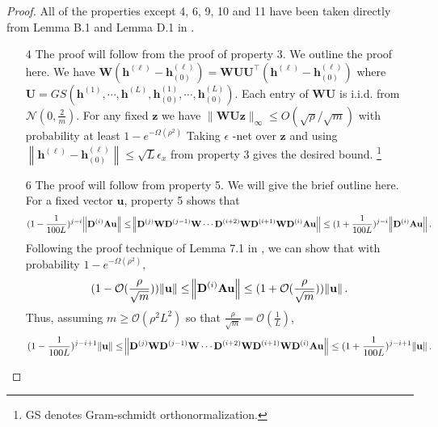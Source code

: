 \begin{proof}
	All of the properties except 4, 6, 9, 10 and 11 have been taken directly from Lemma B.1 and Lemma D.1 in \cite{allen2019can}. 
	\begin{enumerate}
		\item[4] The proof will follow from the proof of property 3. We outline the proof here. We have $\mathbf{W} (\mathbf{h}^{(\ell)} - \mathbf{h}^{(\ell)}_{(0)}) = \mathbf{W} \mathbf{U} \mathbf{U}^{\top} (\mathbf{h}^{(\ell)} - \mathbf{h}^{(\ell)}_{(0)})$ where $\mathbf{U}=G S\left(\mathbf{h}^{(1)}, \cdots, \mathbf{h}^{(L)}, \mathbf{h}^{(1)}_{(0)}, \cdots, \mathbf{h}^{(L)}_{(0)}\right) .$ Each entry of $\mathbf{W} \mathbf{U}$ is i.i.d. from $\mathcal{N}\left(0, \frac{2}{m}\right) .$ For any fixed $\mathbf{z}$ we have $\|\mathbf{W} \mathbf{U} \mathbf{z}\|_{\infty} \leq O(\sqrt{\rho} / \sqrt{m})$ with probability at least $1-e^{-\Omega\left(\rho^{2}\right)}$
		Taking $\epsilon$ -net over $\mathbf{z}$ and using $\left\|\mathbf{h}^{(\ell)} - \mathbf{h}^{(\ell)}_{(0)}\right\| \leq \sqrt{L}\epsilon_x$ from property 3 gives the desired bound. \footnote{GS denotes Gram-schmidt orthonormalization.}
		\item[6] The proof will follow from property 5. We will give the brief outline here. For a fixed vector $\mathbf{u}$, property 5 shows that
		\begin{equation*}
			(1 - \frac{1}{100L})^{j-i} \norm{\mathbf{D}^{(i)} \mathbf{A} \mathbf{u}} \le \norm{\mathbf{D}^{(j)} \mathbf{W} \mathbf{D}^{(j-1)} \mathbf{W} \cdots \mathbf{D}^{(i+2)} \mathbf{W} \mathbf{D}^{(i+1)} \mathbf{W} \mathbf{D}^{(i)} \mathbf{A} \mathbf{u} } \le (1 + \frac{1}{100L})^{j-i} \norm{\mathbf{D}^{(i)} \mathbf{A} \mathbf{u}}.
		\end{equation*}
		Following the proof technique of Lemma 7.1 in \cite{allen2018convergence}, we can show that with probability $1-e^{-\Omega(\rho^2)}$,
		\begin{align*}
			(1 - \mathcal{O}(\frac{\rho}{\sqrt{m}})) \norm{\mathbf{u}} \le \norm{\mathbf{D}^{(i)} \mathbf{A} \mathbf{u}} \le (1 + \mathcal{O}(\frac{\rho}{\sqrt{m}})) \norm{\mathbf{u}}. 
		\end{align*}
		Thus, assuming $m \ge \mathcal{O}(\rho^2 L^2)$ so that $\frac{\rho}{\sqrt{m}} = \mathcal{O}(\frac{1}{L})$,
		\begin{equation*}
			(1 - \frac{1}{100L})^{j-i + 1} \norm{\mathbf{u}} \le \norm{\mathbf{D}^{(j)} \mathbf{W} \mathbf{D}^{(j-1)} \mathbf{W} \cdots \mathbf{D}^{(i+2)} \mathbf{W} \mathbf{D}^{(i+1)} \mathbf{W} \mathbf{D}^{(i)} \mathbf{A} \mathbf{u}} \le (1 + \frac{1}{100L})^{j-i + 1} \norm{\mathbf{u}}.

\end{equation*}
\end{enumerate}
\end{proof}
